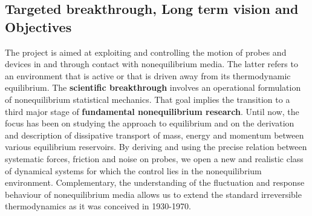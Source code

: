 
\subsection{Targeted breakthrough, Long term vision and Objectives}\label{sec:objectives}


The project is aimed at exploiting and controlling the motion of probes and devices in and
through contact with nonequilibrium media.  The latter refers to an environment that is
active or that is driven away from its thermodynamic equilibrium.  The {\bf scientific
  breakthrough} involves an operational formulation of nonequilibrium statistical mechanics.
That goal implies the transition to a third major stage of {\bf fundamental nonequilibrium
  research}. Until now, the focus has been on studying the approach to equilibrium and on
the derivation and description of dissipative transport of mass, energy and momentum between
various equilibrium reservoirs.  By deriving and using the precise relation between
systematic forces, friction and noise on probes, we open a new and realistic class of
dynamical systems for which the control lies in the nonequilibrium environment.
Complementary, the understanding of the fluctuation and response behaviour of nonequilibrium
media allows us to extend the standard irreversible thermodynamics as it was conceived in
1930-1970.

